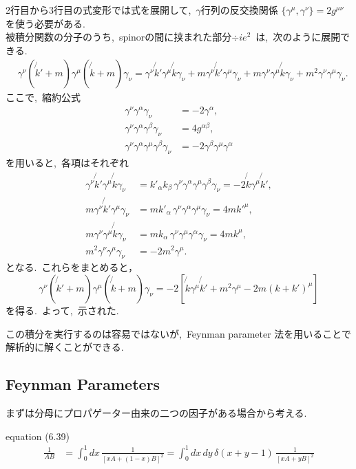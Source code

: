 \documentclass[uplatex,dvipdfmx,a4paper,11pt]{jsarticle}
\begin{document}
\begin{myproof}
  2行目から3行目の式変形では式を展開して,~$\gamma$行列の反交換関係 \(\{\gamma^\mu,\gamma^\nu\}=2g^{\mu\nu}\) を使う必要がある.\\
  被積分関数の分子のうち,~spinorの間に挟まれた部分$÷ie^2$~は,~次のように展開できる.
\[
\begin{aligned}
&\gamma^\nu(\not{k}'+m)\gamma^\mu(\not{k}+m)\gamma_\nu =
\gamma^\nu\not{k}'\gamma^\mu\not{k}\gamma_\nu
+m\gamma^\nu\not{k}'\gamma^\mu\gamma_\nu
+m\gamma^\nu\gamma^\mu\not{k}\gamma_\nu
+m^2\gamma^\nu\gamma^\mu\gamma_\nu.
\end{aligned}
\]
ここで,~縮約公式
\[
\begin{aligned}
\gamma^\nu\gamma^\alpha\gamma_\nu
&=-2\gamma^\alpha,\\
\gamma^\nu\gamma^\alpha\gamma^\beta\gamma_\nu
&=4g^{\alpha\beta},\\
\gamma^\nu\gamma^\alpha\gamma^\mu\gamma^\beta\gamma_\nu
&=-2\gamma^\beta\gamma^\mu\gamma^\alpha
\end{aligned}
\]
を用いると,~各項はそれぞれ
\[
\begin{aligned}
\gamma^\nu\not{k}'\gamma^\mu\not{k}\gamma_\nu
&=k'_\alpha k_\beta\,
  \gamma^\nu\gamma^\alpha\gamma^\mu\gamma^\beta\gamma_\nu
=-2\not{k}\gamma^\mu\not{k}',
\\[6pt]
m\gamma^\nu\not{k}'\gamma^\mu\gamma_\nu
&=mk'_\alpha\,
  \gamma^\nu\gamma^\alpha\gamma^\mu\gamma_\nu
=4mk'^\mu,
\\[6pt]
m\gamma^\nu\gamma^\mu\not{k}\gamma_\nu
&=mk_\alpha\,
  \gamma^\nu\gamma^\mu\gamma^\alpha\gamma_\nu
=4mk^\mu,
\\[6pt]
m^2\gamma^\nu\gamma^\mu\gamma_\nu
&=-2m^2\gamma^\mu.
\end{aligned}
\]
となる.~これらをまとめると，
\[
\gamma^\nu(\not{k}'+m)\gamma^\mu(\not{k}+m)\gamma_\nu
=-2\left[
\not{k}\gamma^\mu\not{k}'
+m^2\gamma^\mu
-2m(k+k')^\mu
\right]
\]
を得る.~よって,~示された.
\end{myproof}
この積分を実行するのは容易ではないが,~Feynman parameter 法を用いることで解析的に解くことができる.
\subsection{Feynman Parameters}
まずは分母にプロパゲーター由来の二つの因子がある場合から考える.~
\begin{mylemma}{equation (6.39)}
\begin{equation}
\begin{aligned}
\frac{1}{AB}
&=\int_0^1 dx\,
\frac{1}{[xA+(1-x)B]^2}
=\int_0^1 dx\,dy\,
\delta(x+y-1)\,
\frac{1}{[xA+yB]^2}
\end{aligned} 
\end{equation}
\end{mylemma}
\end{document}

